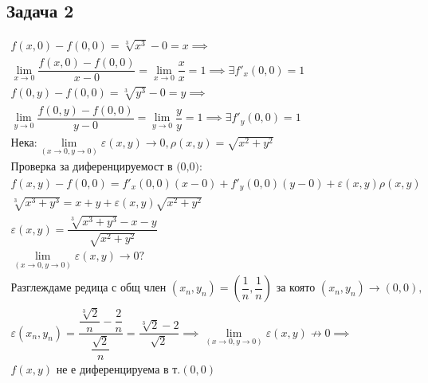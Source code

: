 \documentclass[a4paper,fleqn,12pt]{article}
\theoremstyle{definition}
\begin{document}
\subsection*{Задача 2}
\begin{gather*}
f(x,0) - f(0,0) = \sqrt[3]{x^3} - 0 = x\implies \\
\lim\limits_{x \to 0} \dfrac{f(x,0) - f(0,0)}{x - 0}= \lim\limits_{x \to 0} \dfrac{x}{x} = 1 \implies \exists f'_x(0,0) = 1\\
f(0,y) - f(0,0) = \sqrt[3]{y^3} - 0 = y \implies \\
\lim\limits_{y \to 0}\dfrac{f(0,y) - f(0,0)}{y - 0} = \lim\limits_{y \to 0} \dfrac{y}{y} = 1 \implies \exists f'_y(0,0) = 1\\
\text{Нека:}
\lim\limits_ {(x \to 0, y \to 0)} \varepsilon (x,y) \to 0, \rho (x,y) = \sqrt{x^2 + y^2}\\
\text{Проверка за диференцируемост в (0,0):}\\
f(x,y) - f(0,0)  = f'_x(0,0)(x - 0) + f'_y(0,0)(y-0) + \varepsilon (x,y) \rho (x,y) \\
\sqrt[3]{x^3 + y^3} = x + y + \varepsilon (x,y) \sqrt{x^2 + y^2} \\
\varepsilon (x,y) = \dfrac{\sqrt[3]{x^3 + y^3} - x - y}{ \sqrt{x^2 + y^2}} \\
\lim\limits_ {(x \to 0, y \to 0)} \varepsilon (x,y) \to 0?\\
\text{Разглеждаме редица с общ член } (x_n, y_n) = \left( \dfrac{1}{n}, \dfrac{1}{n} \right) \text{ за която } (x_n, y_n) \to (0,0), \\
\varepsilon (x_n, y_n) = \dfrac{\dfrac{\sqrt[3]{2}}{n} - \dfrac{2}{n}}{\dfrac{\sqrt{2}}{n}} = \dfrac{\sqrt[3]{2} - 2}{\sqrt{2}} \implies \lim\limits_ {(x \to 0, y \to 0)} \varepsilon (x,y) \not\to 0 \implies \\
 f(x,y) \text{ не е диференцируема в т.} (0,0)
\end{gather*}
\end{document}
